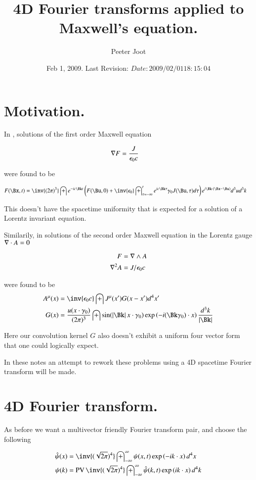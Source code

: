 \documentclass{article}
\title{ 4D Fourier transforms applied to Maxwell's equation. }
\author{Peeter Joot}
\date{ Feb 1, 2009.  Last Revision: $Date: 2009/02/01 18:15:04 $ }
\begin{document}
\maketitle{}
\tableofcontents

\section{ Motivation. }

In \cite{PJfirstOrderMaxwell}, solutions of the first order Maxwell equation

\begin{align}
\nabla F &= \frac{J }{\epsilon_0 c}
\end{align}

were found to be

\begin{align}
F(\Bx,t) 
&=
\inv{({2\pi})^3} \int 
e^{-i c \Bk t}
\left(
F(\Bu, 0) + \inv{\epsilon_0} \int_{\tau = -\infty}^{t} e^{i c \Bk \tau } \gamma_0 J(\Bu,\tau)  d\tau  
\right)
e^{i \Bk \cdot (\Bx-\Bu)} 
d^3 u
d^3 k
\end{align}

This doesn't have the spacetime uniformity that is expected for a solution of a Lorentz invariant equation.

Similarily, in \cite{PJfourierMaxwellSecondOrder} solutions of the second order Maxwell equation in the Lorentz gauge
$\nabla \cdot A = 0$ 

\begin{align*}
F &= \nabla \wedge A \\
\nabla^2 A &= J/\epsilon_0 c
\end{align*}

were found to be
\begin{align}\label{eqn:fourVectorPotentials}
{A^\mu}(x)
&= \inv{\epsilon_0 c} \int J^\mu(x') G(x - x') d^4 x' \\
G(x)
&= 
\frac{u(x \cdot \gamma_0)}{ (2\pi)^3 }
\int
\sin( \Abs{\Bk} x \cdot \gamma_0 )
\exp\left( -i (\Bk \gamma_0) \cdot x \right)
\frac{d^3 k}{ \Abs{\Bk} }
\end{align}

Here our convolution kernel $G$ also doesn't exhibit a uniform four vector form that one could logically expect.

In these notes an attempt to rework these problems using a 4D spacetime Fourier transform will be made.

\section{ 4D Fourier transform. }

As before we want a multivector friendly Fourier transform pair, and choose the following

\begin{align}\label{eqn:FourierTxDefinition}
\hat{\psi}(x) &= \inv{(\sqrt{2\pi})^4} \IIinf \psi(x, t) \exp\left( -i k \cdot x \right) d^4 x \\
{\psi}(k) &= \PV \inv{(\sqrt{2\pi})^4} \IIinf \hat{\psi}(k, t) \exp\left( i k \cdot x \right) d^4 k
\end{align}



\end{document}
